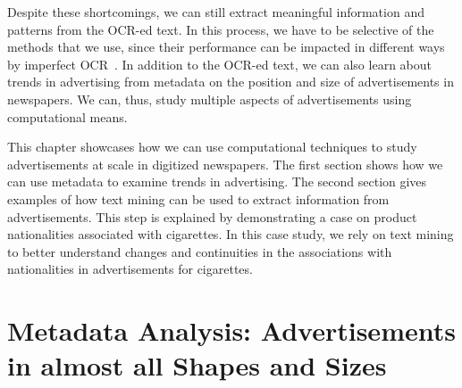 \documentclass[USenglish]{article}
\begin{document}
Despite these shortcomings, we can still extract meaningful information and patterns from the OCR-ed text. In this process, we have to be selective of the methods that we use, since their performance can be impacted in different ways by imperfect OCR~\cite{van_strien_assessing_2020,hillQuantifyingImpactDirty2019}. In addition to the OCR-ed text, we can also learn about trends in advertising from metadata on the position and size of advertisements in newspapers. We can, thus, study multiple aspects of advertisements using computational means. 

This chapter showcases how we can use computational techniques to study advertisements at scale in digitized newspapers. The first section shows how we can use metadata to examine trends in advertising. The second section gives examples of how text mining can be used to extract information from advertisements. This step is explained by demonstrating a case on product nationalities associated with cigarettes. In this case study, we rely on text mining to better understand changes and continuities in the associations with nationalities in advertisements for cigarettes.

\section{Metadata Analysis: Advertisements in almost all Shapes and Sizes}
\end{document}
